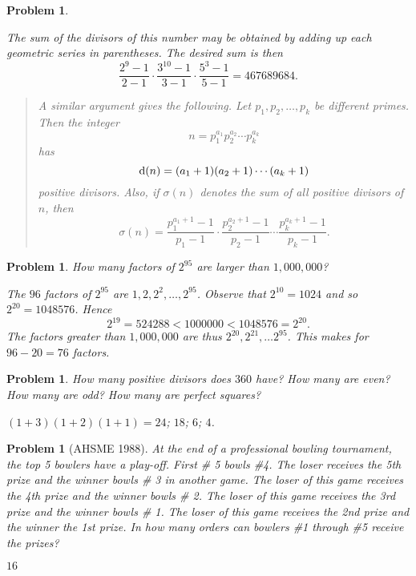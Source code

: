 \documentclass[11pt, openany]{book}
\theoremstyle{change} \theoremheaderfont{\blue\sffamily\bfseries}
\newtheorem{pro}[thm]{Problem}
\theoremstyle{nonumberplain} \theoremheaderfont{\sffamily\bfseries}
\newenvironment{rem}[0]{\begin{quote}{\huge\textcolor{red}{\Pisymbol{pzd}{43}}}\itshape }{\end{quote}}
\newcommand{\í}{\'{\i}}
\begin{document}
\begin{multicols}{2}
\begin{pro}
\begin{answer}
The sum of the divisors of this number may be obtained by adding up
each geometric series in parentheses. The desired sum is then
$$\frac{2^9 - 1}{2 - 1}\cdot\frac{3^{10} - 1}{3 - 1}\cdot\frac{5^{3} - 1}{5 - 1}
= 467689684.$$
\begin{rem}A similar argument gives the following.
Let $p_1, p_2, \ldots , p_k$ be different primes. Then the integer
$$n = p_1 ^{a_1} p_2 ^{a_2} \cdots  p_k  ^{a_k}  $$has
$${\rm d}(n) = (a_1 + 1)(a_2 + 1)\cdots (a_k + 1)
$$positive divisors. Also, if  $\sigma (n)$ denotes the sum of all positive divisors of $n$, then $$\sigma (n) =
\frac{p_1 ^{a_1 + 1} - 1}{p_1 - 1}\cdot\frac{p_2 ^{a_2 + 1} - 1}{p_2
- 1}\cdots \frac{p_k ^{a_k + 1} - 1}{p_k - 1}.$$
\end{rem}
\end{answer}
\end{pro}
\begin{pro} How many factors of $2^{95}$ are larger than $1,000,000$?
\begin{answer} The $96$ factors of $2^{95}$ are  $1, 2, 2^2, \ldots ,
2^{95}$. Observe that $2^{10} = 1024$ and so $2^{20} = 1048576$.
Hence
$$2^{19} = 524288 < 1000000 < 1048576 = 2^{20}.$$ The factors
greater than $1,000,000$ are thus $2^{20}, 2^{21}, \ldots 2^{95}$.
This makes for $96 - 20 = 76$ factors.
\end{answer}
\end{pro}


            \begin{pro}
How many positive divisors does $360$ have? How many are even? How
many are odd? How many are perfect squares?
\begin{answer}$(1+3)(1+2)(1+1)=24$; $18$; $ 6$; $4$. \end{answer}
     \end{pro}
         \begin{pro}[AHSME 1988]
 At the end of a professional bowling tournament, the top 5
bowlers have a play-off. First \# 5 bowls \#4. The loser receives
the 5th prize and the winner bowls \# 3 in another game. The loser
of this game receives the 4th prize and the winner bowls \# 2. The
loser of this game receives the 3rd prize and the winner bowls \# 1.
The loser of this game
 receives the 2nd prize and the winner the 1st prize.  In how many orders can bowlers \#1 through \#5 receive the prizes?
\begin{answer}$16$
\end{answer}
\end{pro}


\end{multicols}
\end{document}
